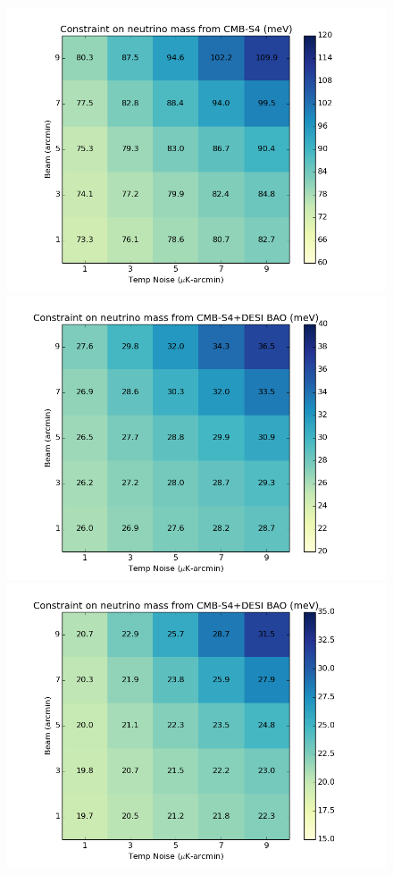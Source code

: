 \begin{figure}[ht]
\begin{center}
\includegraphics[scale=0.4]{Neutrinos/S4_BeamVsNoise.png}
\includegraphics[scale=0.4]{Neutrinos/S4+DESI_BeamVsNoise.png}  
\includegraphics[scale=0.4]{Neutrinos/S4+DESI_BeamVsNoise_tauprior.png}


\end{center}
\end{figure}
